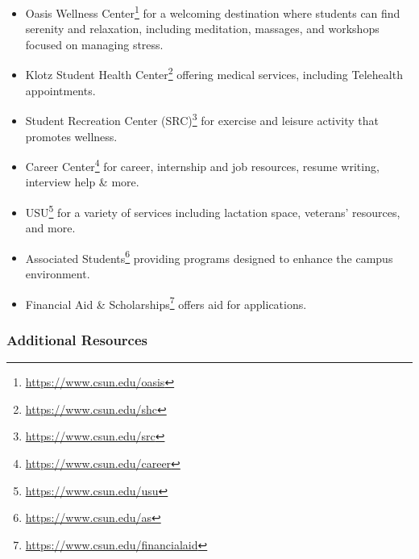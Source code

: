 \documentclass[
  letterpaper,
  DIV=11,
  numbers=noendperiod]{scrartcl}
\DeclareRobustCommand{\href}[2]{#2\footnote{\url{#1}}}
\begin{document}
\begin{itemize}
\item
  \href{https://www.csun.edu/oasis}{Oasis Wellness Center} for a
  welcoming destination where students can find serenity and relaxation,
  including meditation, massages, and workshops focused on managing
  stress.
\item
  \href{https://www.csun.edu/shc}{Klotz Student Health Center} offering
  medical services, including Telehealth appointments.
\item
  \href{https://www.csun.edu/src}{Student Recreation Center (SRC)} for
  exercise and leisure activity that promotes wellness.
\item
  \href{https://www.csun.edu/career}{Career Center} for career,
  internship and job resources, resume writing, interview help \& more.
\item
  \href{https://www.csun.edu/usu}{USU} for a variety of services
  including lactation space, veterans' resources, and more.
\item
  \href{https://www.csun.edu/as}{Associated Students} providing programs
  designed to enhance the campus environment.
\item
  \href{https://www.csun.edu/financialaid}{Financial Aid \&
  Scholarships} offers aid for applications.
\end{itemize}

\hypertarget{additional-resources-1}{%
\subsubsection{\texorpdfstring{\textbf{Additional
Resources}}{Additional Resources}}\label{additional-resources-1}}
\end{document}

